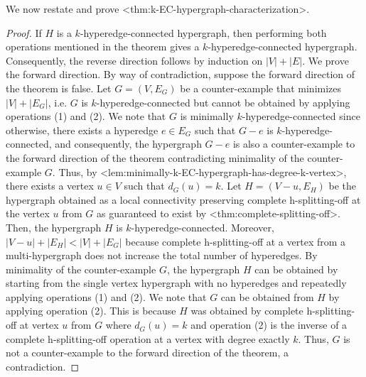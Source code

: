 \documentclass{article}
\def\Cref#1{<#1>}%
\newcommand{\shubhang}[1]{{\color{blue}[{\tiny Shubhang: \bf #1}]\marginpar{\color{blue}*}}}
\newcommand{\knote}[1]{{\color{red}[{\tiny Karthik: \bf #1}]\marginpar{\color{red}*}}}
\begin{document}
We now restate and prove \Cref{thm:k-EC-hypergraph-characterization}. 

\thmConstructiveCharacterization*
\begin{proof}%
    If $H$ is a $k$-hyperedge-connected hypergraph, then performing both operations mentioned in the theorem gives a $k$-hyperedge-connected hypergraph. Consequently, the reverse direction follows by induction on $|V| + |E|$. We prove the forward direction.  By way of contradiction, suppose the forward direction of the theorem is false. Let $G = (V, E_G)$ be a counter-example that minimizes $|V| + |E_G|$, i.e. $G$ is $k$-hyperedge-connected but cannot be obtained by applying operations (1) and (2). We note that $G$ is minimally $k$-hyperedge-connected since otherwise, there exists a hyperedge $e \in E_G$ such that $G - e$ is $k$-hyperedge-connected, and consequently, the hypergraph $G - e$ is also a counter-example to the forward direction of the theorem contradicting minimality of the counter-example $G$. Thus, by \Cref{lem:minimally-k-EC-hypergraph-has-degree-k-vertex}, there exists a vertex $u \in V$ such that $d_G(u) = k$. Let $H = (V - u, E_H)$ be the hypergraph obtained as a local connectivity preserving complete h-splitting-off at the vertex $u$ from $G$ as guaranteed to exist by \Cref{thm:complete-splitting-off}. Then, the hypergraph $H$ is $k$-hyperedge-connected. Moreover, $|V-u| + |E_H| < |V| + |E_G|$ because complete h-splitting-off at a vertex from a multi-hypergraph does not increase the total number of hyperedges. 
    By minimality of the counter-example $G$, the hypergraph $H$ can be obtained by starting from the single vertex hypergraph with no hyperedges and repeatedly applying operations (1) and (2). 
    We note that $G$ can be obtained from $H$ by applying operation (2). This is because $H$ was obtained by complete h-splitting-off at vertex $u$ from $G$ where $d_G(u)=k$ and operation (2) is the inverse of a complete h-splitting-off operation at a vertex with degree exactly $k$. 
    Thus, $G$ is not a counter-example to the forward direction of the theorem, a contradiction.
\end{proof}
\end{document}
